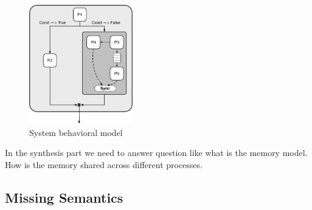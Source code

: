 \begin{figure}[h]
    \centering
    \includegraphics[width=0.4\textwidth]{figures/Introduction/Task_Graph.pdf}
    \caption{System behavioral model}
    \label{fig:task_graph}
\end{figure}


In the synthesis part we need to answer question like what is the memory model. How is the memory shared across different processes.



\subsection{Missing Semantics}
\label{sec:missing_semantics}

